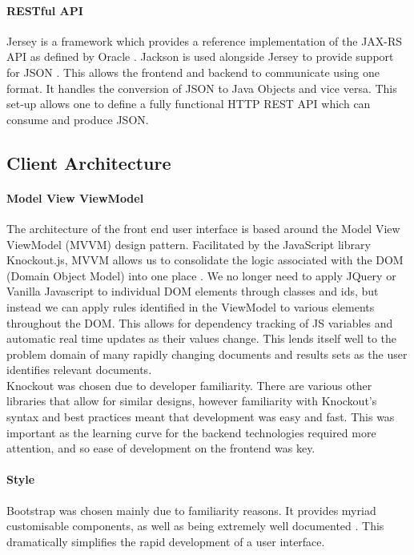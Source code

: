 \documentclass{l4proj}
\begin{document}
\paragraph{RESTful API}
Jersey is a framework which provides a reference implementation of the JAX-RS API as defined by Oracle \cite{jersey} \cite{jaxrsapi}.
Jackson is used alongside Jersey to provide support for JSON \cite{jackson}. This allows the frontend and backend to communicate using one format. It handles the conversion of JSON to Java Objects and vice versa.
This set-up allows one to define a fully functional HTTP REST API which can consume and produce JSON.


\subsection{Client Architecture}
\paragraph{Model View ViewModel}
The architecture of the front end user interface is based around the Model View ViewModel (MVVM) design pattern. Facilitated by the JavaScript library Knockout.js, MVVM allows us to consolidate the logic associated with the DOM (Domain Object Model) into one place \cite{knockout}.
We no longer need to apply JQuery or Vanilla Javascript to individual DOM elements through classes and ids, but instead we can apply rules identified in the ViewModel to various elements throughout the DOM. This allows for dependency tracking of JS variables and automatic real time updates as their values change.
This lends itself well to the problem domain of many rapidly changing documents and results sets as the user identifies relevant documents. \\
Knockout was chosen due to developer familiarity. There are various other libraries that allow for similar designs, however familiarity with Knockout's syntax and best practices meant that development was easy and fast.
This was important as the learning curve for the backend technologies required more attention, and so ease of development on the frontend was key.

\paragraph{Style}
Bootstrap was chosen mainly due to familiarity reasons. It provides myriad customisable components, as well as being extremely well documented \cite{bootstrap}. This dramatically simplifies the rapid development of a user interface.
\end{document}
